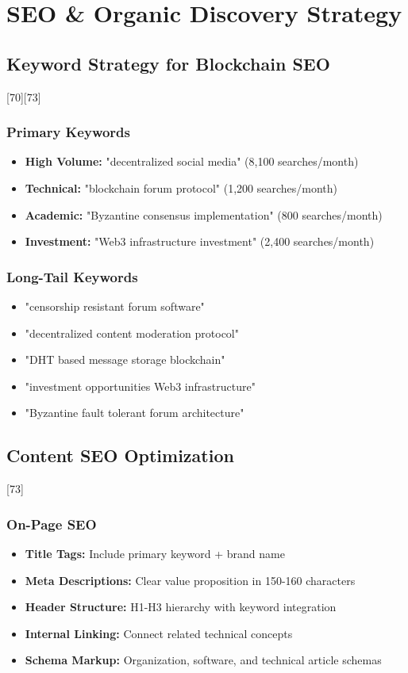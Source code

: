 \documentclass[12pt,a4paper]{article}
\begin{document}
\section{SEO \& Organic Discovery Strategy}

\subsection{Keyword Strategy for Blockchain SEO}[70][73]

\subsubsection{Primary Keywords}
\begin{itemize}
    \item \textbf{High Volume:} "decentralized social media" (8,100 searches/month)
    \item \textbf{Technical:} "blockchain forum protocol" (1,200 searches/month)
    \item \textbf{Academic:} "Byzantine consensus implementation" (800 searches/month)
    \item \textbf{Investment:} "Web3 infrastructure investment" (2,400 searches/month)
\end{itemize}

\subsubsection{Long-Tail Keywords}
\begin{itemize}
    \item "censorship resistant forum software"
    \item "decentralized content moderation protocol"
    \item "DHT based message storage blockchain"
    \item "investment opportunities Web3 infrastructure"
    \item "Byzantine fault tolerant forum architecture"
\end{itemize}

\subsection{Content SEO Optimization}[73]

\subsubsection{On-Page SEO}
\begin{itemize}
    \item \textbf{Title Tags:} Include primary keyword + brand name
    \item \textbf{Meta Descriptions:} Clear value proposition in 150-160 characters
    \item \textbf{Header Structure:} H1-H3 hierarchy with keyword integration
    \item \textbf{Internal Linking:} Connect related technical concepts
    \item \textbf{Schema Markup:} Organization, software, and technical article schemas
\end{itemize}
\end{document}
